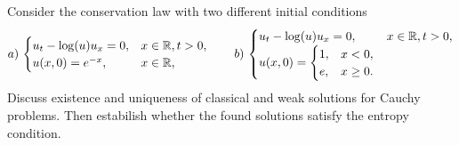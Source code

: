 \newpage
\begin{exercise}
    Consider the conservation law with two different initial conditions
    \begin{equation*}
        a)\,\begin{cases}
            u_t - \log(u) u_x = 0, & x \in \mathbb{R}, t > 0, \\
            u(x,0) = e^{-x}, & x \in \mathbb{R},
        \end{cases}
        \qquad 
        b)\,\begin{cases}
            u_t - \log(u) u_x = 0, & x \in \mathbb{R}, t > 0, \\
            u(x,0) = \begin{cases}
                1, & x < 0, \\
                e, & x \geq 0.
            \end{cases}
        \end{cases}
    \end{equation*}
    Discuss existence and uniqueness of classical and weak solutions for Cauchy problems. Then estabilish whether the found solutions satisfy the entropy condition.
\end{exercise}
